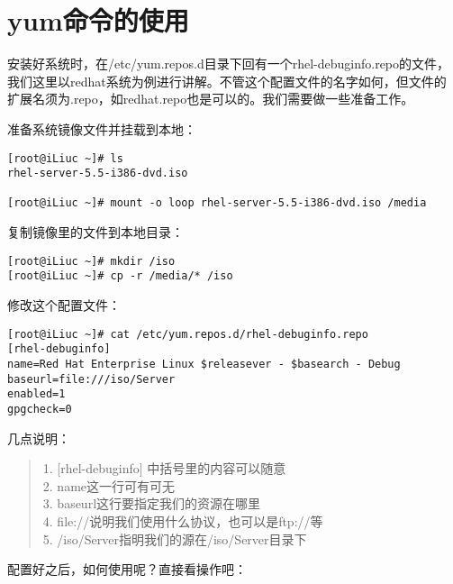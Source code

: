 \section{yum命令的使用}
\label{sec:yumCmd}
安装好系统时，在/etc/yum.repos.d目录下回有一个rhel-debuginfo.repo的文件，
我们这里以redhat系统为例进行讲解。不管这个配置文件的名字如何，但文件的
扩展名须为.repo，如redhat.repo也是可以的。我们需要做一些准备工作。

准备系统镜像文件并挂载到本地：

\small{
\begin{verbatim}
[root@iLiuc ~]# ls 
rhel-server-5.5-i386-dvd.iso

[root@iLiuc ~]# mount -o loop rhel-server-5.5-i386-dvd.iso /media
\end{verbatim}
}
\normalsize

复制镜像里的文件到本地目录：

\begin{verbatim}
[root@iLiuc ~]# mkdir /iso
[root@iLiuc ~]# cp -r /media/* /iso
\end{verbatim}

修改这个配置文件：

\begin{verbatim}
[root@iLiuc ~]# cat /etc/yum.repos.d/rhel-debuginfo.repo
[rhel-debuginfo]
name=Red Hat Enterprise Linux $releasever - $basearch - Debug
baseurl=file:///iso/Server
enabled=1
gpgcheck=0
\end{verbatim}

几点说明：

\begin{quote}
    1. [rhel-debuginfo] 中括号里的内容可以随意 \\
    2. name这一行可有可无 \\
    3. baseurl这行要指定我们的资源在哪里 \\
    4. file://说明我们使用什么协议，也可以是ftp://等 \\
    5. /iso/Server指明我们的源在/iso/Server目录下
\end{quote}

配置好之后，如何使用呢？直接看操作吧：

